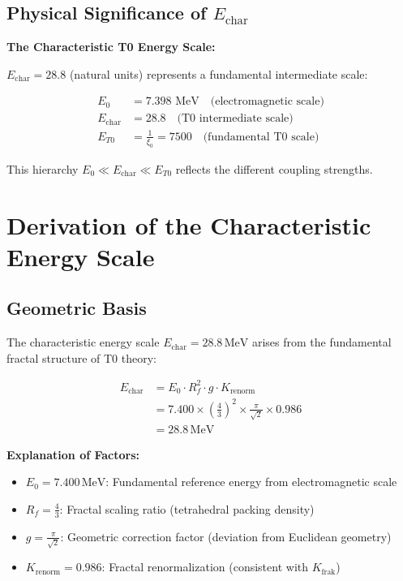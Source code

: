 	\subsection{Physical Significance of $E_{\text{char}}$}
	
	\begin{keyresult}
		\textbf{The Characteristic T0 Energy Scale:}
		
		$E_{\text{char}} = 28.8$ (natural units) represents a fundamental intermediate scale:
		
		\begin{align}
			E_0 &= 7.398 \text{ MeV} \quad \text{(electromagnetic scale)} \\
			E_{\text{char}} &= 28.8 \quad \text{(T0 intermediate scale)} \\
			E_{T0} &= \frac{1}{\xi_0} = 7500 \quad \text{(fundamental T0 scale)}
		\end{align}
		
		This hierarchy $E_0 \ll E_{\text{char}} \ll E_{T0}$ reflects the different coupling strengths.
	\end{keyresult}
	
	\section{Derivation of the Characteristic Energy Scale}
	
	\subsection{Geometric Basis}
	
	The characteristic energy scale $E_{\text{char}} = 28.8\,\text{MeV}$ arises from the fundamental fractal structure of T0 theory:
	
	\begin{align}
		E_{\text{char}} &= E_0 \cdot R_f^2 \cdot g \cdot K_{\text{renorm}} \\
		&= 7.400 \times \left(\frac{4}{3}\right)^2 \times \frac{\pi}{\sqrt{2}} \times 0.986 \\
		&= 28.8\,\text{MeV}
	\end{align}
	
	\textbf{Explanation of Factors:}
	\begin{itemize}
		\item $E_0 = 7.400\,\text{MeV}$: Fundamental reference energy from electromagnetic scale
		\item $R_f = \frac{4}{3}$: Fractal scaling ratio (tetrahedral packing density)  
		\item $g = \frac{\pi}{\sqrt{2}}$: Geometric correction factor (deviation from Euclidean geometry)
		\item $K_{\text{renorm}} = 0.986$: Fractal renormalization (consistent with $K_{\text{frak}}$)
	\end{itemize}
	
